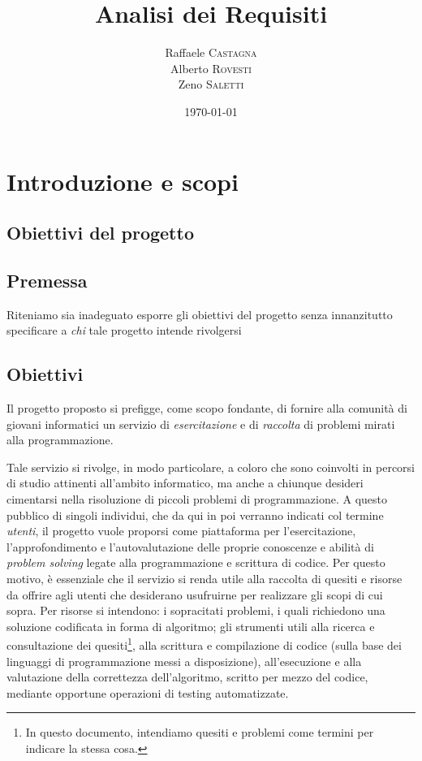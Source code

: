 \documentclass[11pt, a4paper]{article}
\title{Analisi dei Requisiti}
\author{Raffaele \textsc{Castagna}\\
Alberto \textsc{Rovesti}\\
Zeno \textsc{Saletti}}
\date{\today}
\begin{document}


\tableofcontents

\newpage
\section{Introduzione e scopi}
\subsection{Obiettivi del progetto}


\subsection{Premessa}
Riteniamo sia inadeguato esporre gli obiettivi del progetto senza innanzitutto specificare a \textit{chi} tale progetto intende rivolgersi

\subsection{Obiettivi}
Il progetto proposto si prefigge, come scopo fondante, di fornire alla comunità
di giovani informatici un servizio di \textit{esercitazione} e di
\textit{raccolta} di problemi mirati alla programmazione.

Tale servizio si rivolge, in modo particolare, a coloro che sono coinvolti
in percorsi di studio attinenti all'ambito informatico, ma anche a chiunque
desideri cimentarsi nella risoluzione di piccoli problemi di programmazione.
A questo pubblico di singoli individui, che da qui in poi verranno indicati
col termine \textit{utenti}, il progetto vuole proporsi come piattaforma per l'esercitazione, l'approfondimento e l'autovalutazione delle proprie conoscenze e abilità di \textit{problem solving}
legate alla programmazione e scrittura di codice. Per questo motivo, è essenziale che il servizio
si renda utile alla raccolta di quesiti e risorse da offrire agli utenti
che desiderano usufruirne per realizzare gli scopi di cui sopra.
Per risorse si intendono: i sopracitati problemi, i quali richiedono
una soluzione codificata in forma di algoritmo;
gli strumenti utili alla ricerca e consultazione dei
quesiti\footnote{In questo documento, intendiamo quesiti e problemi
come termini per indicare la stessa cosa.}, alla scrittura e
compilazione di codice (sulla base dei linguaggi di programmazione
messi a disposizione), all'esecuzione e alla valutazione della
correttezza dell'algoritmo, scritto per mezzo del codice, mediante
opportune operazioni di testing automatizzate.
\end{document}
